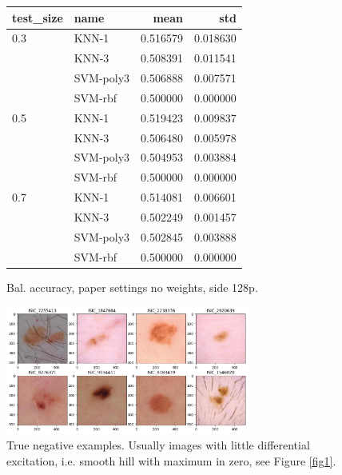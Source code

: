\documentclass[a4paper,10pt,twocolumn]{article}
\begin{document}
\begin{figure}[H]
    \begin{center}
    \begin{tabular}{llrr}
    \toprule
    test\_size & name &   mean &  std \\
    \midrule
    0.3 & KNN-1 &  0.516579 &  0.018630 \\
        & KNN-3 &  0.508391 &  0.011541 \\
        & SVM-poly3 &  0.506888 &  0.007571 \\
        & SVM-rbf &  0.500000 &  0.000000 \\
    0.5 & KNN-1 &  0.519423 &  0.009837 \\
        & KNN-3 &  0.506480 &  0.005978 \\
        & SVM-poly3 &  0.504953 &  0.003884 \\
        & SVM-rbf &  0.500000 &  0.000000 \\
    0.7 & KNN-1 &  0.514081 &  0.006601 \\
        & KNN-3 &  0.502249 &  0.001457 \\
        & SVM-poly3 &  0.502845 &  0.003888 \\
        & SVM-rbf &  0.500000 &  0.000000 \\
    \bottomrule
    \end{tabular}
    \end{center}
    \caption{Bal. accuracy, paper settings no weights, side 128p.}
    \label{fig3}
\end{figure}


\begin{figure}[H]
      \begin{center}
            \includegraphics[width=8cm]{true_negative}
      \end{center}
      \caption{True negative examples. Usually images with little differential excitation, i.e. smooth hill with maximum in zero, see Figure \ref{fig1}.}
      \label{fig4}
\end{figure}
\end{document}
